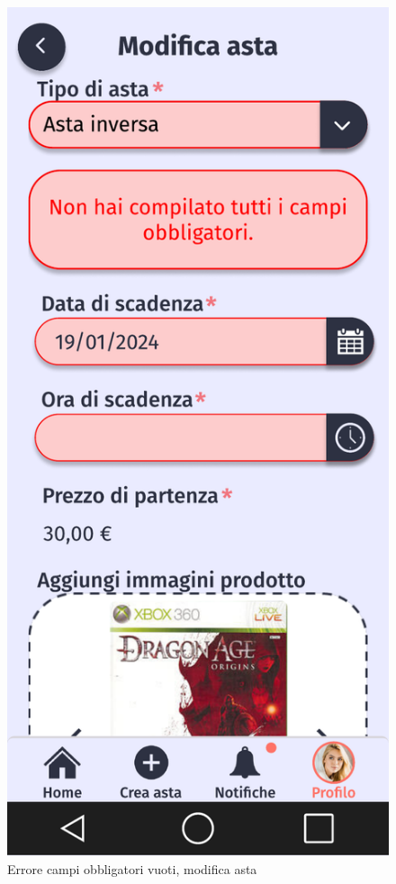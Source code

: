 \begin{figure}[!htb]
\begin{minipage}{0.32\textwidth}
            \includegraphics[width=.7\linewidth]{Immagini/Frames/Errori/E12.pdf}
            \caption{Errore campi obbligatori vuoti, modifica asta}
        \end{minipage}\hfill
    \end{figure}

